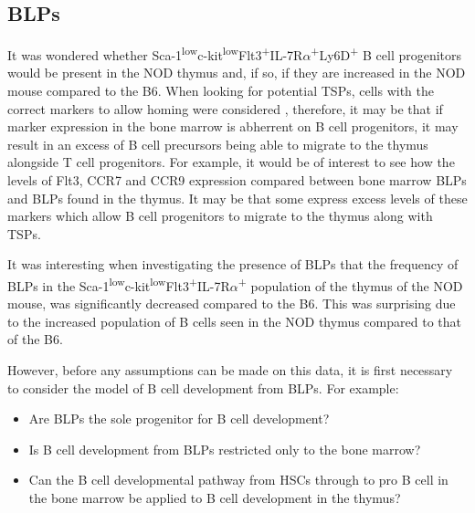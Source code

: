 \subsection{BLPs}


It was wondered whether Sca-1\textsuperscript{low}c-kit\textsuperscript{low}Flt3\textsuperscript{+}IL-7R$\alpha$\textsuperscript{+}Ly6D\textsuperscript{+} B cell progenitors would be present in the NOD thymus and, if so, if they are increased in the NOD mouse compared to the B6.
When looking for potential TSPs, cells with the correct markers to allow homing were considered \citep{Zlotoff2011}, therefore, it may be that if marker expression in the bone marrow is abherrent on B cell progenitors, it may result in an excess of B cell precursors being able to migrate to the thymus alongside T cell progenitors.
For example, it would be of interest to see how the levels of Flt3, CCR7 and CCR9 expression compared between bone marrow BLPs and BLPs found in the thymus.
It may be that some express excess levels of these markers which allow B cell progenitors to migrate to the thymus along with TSPs.

It was interesting when investigating the presence of BLPs that the frequency of BLPs in the Sca-1\textsuperscript{low}c-kit\textsuperscript{low}Flt3\textsuperscript{+}IL-7R$\alpha$\textsuperscript{+} population of the thymus of the NOD mouse, was significantly decreased compared to the B6.
This was surprising due to the increased population of B cells seen in the NOD thymus compared to that of the B6.

However, before any assumptions can be made on this data, it is first necessary to consider the model of B cell development from BLPs.
For example:
\begin{itemize}
\item Are BLPs the sole progenitor for B cell development?
\item Is B cell development from BLPs restricted only to the bone marrow?
\item Can the B cell developmental pathway from HSCs through to pro B cell in the bone marrow be applied to B cell development in the thymus?
\end{itemize}

